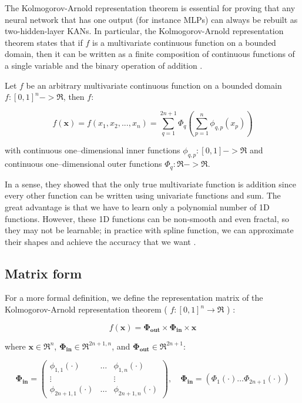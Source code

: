 \documentclass[12pt,a4paper]{article}
\begin{document}
The Kolmogorov-Arnold representation theorem is essential for proving that any neural network that has one output (for instance MLPs) can always be rebuilt as two-hidden-layer KANs. In particular, the Kolmogorov-Arnold representation theorem states that if $f$ is a multivariate continuous function on a bounded domain, then it can be written as a finite composition of continuous functions of a single variable and the binary operation of addition \cite{KAtheorem, KArevisited}.

\begin{theorem} 
\label{Kolmogorov-Arnold}
Let $f$ be an arbitrary multivariate continuous function on a bounded domain $f:[0,1]^n -> \Re$, then $f$:

$$f(\textbf{x}) = f(x_1,x_2,...,x_n) = \sum_{q=1}^{2n+1} \Phi_q(\sum_{p=1}^n \phi_{q,p}(x_p))$$

with continuous one–dimensional inner functions $\phi_{q,p}:[0,1] -> \Re$ and continuous one–dimensional outer functions $\Phi_q:\Re -> \Re$.
\end{theorem} 

In a sense, they showed that the only true multivariate function is addition since every other function can be written using univariate functions and sum. The great advantage is that we have to learn only a polynomial number of 1D functions. However, these 1D functions can be non-smooth and even fractal, so they may not be learnable; in practice with spline function, we can approximate their shapes and achieve the accuracy that we want \cite{KAN}.

\subsection{Matrix form}
\label{sec:ma}
For a more formal definition, we define the representation matrix of the Kolmogorov-Arnold representation theorem ( $f: [0,1]^n \rightarrow \Re$ ) \cite{KAN}:

$$f(\textbf{x}) = \boldsymbol{\Phi_{out}} \times \boldsymbol{\Phi_{in} }\times \textbf{x}$$

where $\textbf{x} \in \Re^n$, $\boldsymbol{\Phi_{in}} \in \Re^{2n+1,n}$, and $\boldsymbol{\Phi_{out}} \in \Re^{2n+1}$:

\[
\boldsymbol{\Phi_{in}} = 
\begin{pmatrix}
\phi_{1,1}(\cdot) & \dots & \phi_{1,n}(\cdot) \\
\vdots &   & \vdots \\
\phi_{2n+1,1}(\cdot) & \dots & \phi_{2n+1,n}(\cdot)
\end{pmatrix},
\quad \boldsymbol{\Phi_{in}} = (\Phi_{1}(\cdot) \dots \Phi_{2n+1}(\cdot))
\]
\end{document}
